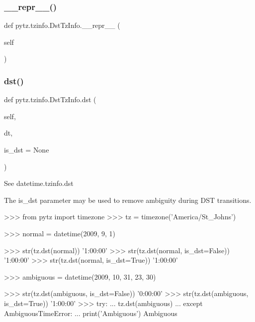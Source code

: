 \mbox{\label{classpytz_1_1tzinfo_1_1DstTzInfo_a610716b635d5b1adddeed97149da9d61}} 
\subsubsection{\texorpdfstring{\+\_\+\+\_\+repr\+\_\+\+\_\+()}{\_\_repr\_\_()}}
{\footnotesize\ttfamily def pytz.\+tzinfo.\+Dst\+Tz\+Info.\+\_\+\+\_\+repr\+\_\+\+\_\+ (\begin{DoxyParamCaption}\item[{}]{self }\end{DoxyParamCaption})}

\mbox{\label{classpytz_1_1tzinfo_1_1DstTzInfo_adbd7011c964e122ada53385ecda40bd2}} 
\subsubsection{\texorpdfstring{dst()}{dst()}}
{\footnotesize\ttfamily def pytz.\+tzinfo.\+Dst\+Tz\+Info.\+dst (\begin{DoxyParamCaption}\item[{}]{self,  }\item[{}]{dt,  }\item[{}]{is\+\_\+dst = {\ttfamily None} }\end{DoxyParamCaption})}

\begin{DoxyVerb}See datetime.tzinfo.dst

The is_dst parameter may be used to remove ambiguity during DST
transitions.

>>> from pytz import timezone
>>> tz = timezone('America/St_Johns')

>>> normal = datetime(2009, 9, 1)

>>> str(tz.dst(normal))
'1:00:00'
>>> str(tz.dst(normal, is_dst=False))
'1:00:00'
>>> str(tz.dst(normal, is_dst=True))
'1:00:00'

>>> ambiguous = datetime(2009, 10, 31, 23, 30)

>>> str(tz.dst(ambiguous, is_dst=False))
'0:00:00'
>>> str(tz.dst(ambiguous, is_dst=True))
'1:00:00'
>>> try:
...     tz.dst(ambiguous)
... except AmbiguousTimeError:
...     print('Ambiguous')
Ambiguous\end{DoxyVerb}
 \mbox{\label{classpytz_1_1tzinfo_1_1DstTzInfo_a94e72e04262b17936c55030253811960}} 
